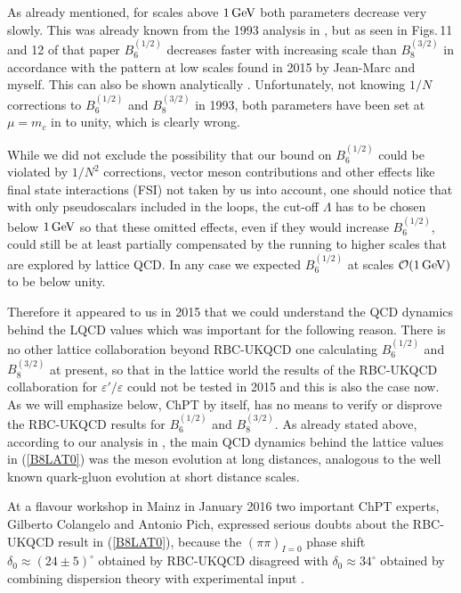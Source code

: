 \documentclass[12pt,a4paper]{article}
\newcommand{\ord}{\mathcal{O}}
\newcommand{\gev}{\, {\rm GeV}}
\newcommand{\bsi}{B_6^{(1/2)}}
\newcommand{\bei}{B_8^{(3/2)}}
\def\epe{\varepsilon'/\varepsilon}
\begin{document}
As already mentioned, for scales above $1\gev$ both parameters decrease very slowly. This was already  known from the 1993 analysis in \cite{Buras:1993dy}, but as seen in Figs.\,11 and 12 of that paper $\bsi$ decreases faster with increasing scale than $\bei$ in accordance with the pattern at low scales found in 2015 by Jean-Marc and 
myself. This can also be shown analytically \cite{Buras:2015xba}.
Unfortunately, not knowing $1/N$ corrections to $\bsi$ and $\bei$ in 1993, both parameters have been set  at $\mu=m_c$ in \cite{Buras:1993dy} to unity, which is clearly wrong.

While we did not exclude the possibility that our bound on $\bsi$ could be violated by $1/N^2$ 
corrections, vector meson contributions and other effects like final state interactions (FSI) not taken by us into account, one should notice that  with only pseudoscalars included in the loops, the cut-off $\Lambda$ has to  be chosen below $1\gev$ so that these 
 omitted effects, even if they would increase 
 $\bsi$, could still be at least partially compensated by the running to 
 higher scales that are explored by lattice QCD. In any case we expected $\bsi$
 at scales $\ord(1\gev)$ to be below unity.

Therefore it appeared to us in 2015 that we could understand the QCD dynamics
behind the LQCD values which was important for the following
reason. There is no other lattice collaboration beyond RBC-UKQCD one calculating $\bsi$ and $\bei$ at present, so that 
in the lattice world the results of the RBC-UKQCD collaboration for $\epe$
could not be tested in 2015 and this is also the case now.
 As we will emphasize   below, ChPT by itself, has no means 
 to verify or disprove the RBC-UKQCD results for $\bsi$ and $\bei$. As already
 stated above, according to our analysis in \cite{Buras:2015xba},
the main QCD dynamics behind the lattice values in (\ref{B8LAT0}) was the
meson evolution at long distances, analogous to the well known quark-gluon evolution at short distance scales.



At a flavour workshop in Mainz in January 2016 two important ChPT experts, 
Gilberto Colangelo and Antonio Pich, expressed serious doubts about the RBC-UKQCD result in (\ref{B8LAT0}), because the $(\pi\pi)_{I=0}$ 
 phase shift $\delta_0\approx (24\pm 5)^\circ$ obtained by RBC-UKQCD disagreed 
 with  $\delta_0\approx 34^\circ$ obtained by combining dispersion 
theory with experimental input \cite{Colangelo:2001df}.
\end{document}
